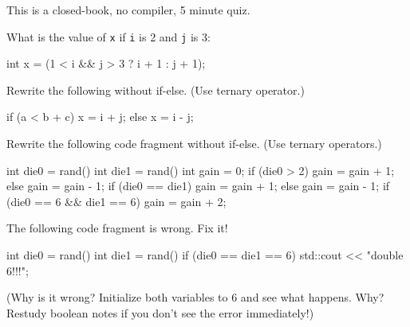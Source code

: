 

This is a closed-book, no compiler, 5 minute quiz.

\nextq
What is the value of \verb!x! if \verb!i! is 2 and \verb!j! is 3:
\begin{console}[fontsize=\footnotesize]
int x = (1 < i && j > 3 ? i + 1 : j + 1);
\end{console}
\ANSWER
\begin{answercode}

\end{answercode}

\nextq
Rewrite the following without if-else.
(Use ternary operator.)
\begin{console}[fontsize=\footnotesize]
if (a < b + c)
{
    x = i + j;
}
else
{
    x = i - j;
}
\end{console}
\ANSWER
\begin{answercode}

\end{answercode}

\nextq
Rewrite the following code fragment without if-else.
(Use ternary operators.)
\ANSWER
\begin{answercode}
int die0 = rand() %
int die1 = rand() %
int gain = 0;
if (die0 > 2)
{
    gain = gain + 1;
}
else
{
    gain = gain - 1;
}
if (die0 == die1)
{
    gain = gain + 1;
}
else
{
    gain = gain - 1;
}
if (die0 == 6 && die1 == 6)
{
    gain = gain + 2;
}
\end{answercode}

\nextq
The following code fragment is wrong. Fix it!
\\
\ANSWER
\begin{answercode}
int die0 = rand() %
int die1 = rand() %
if (die0 == die1 == 6)
{
    std::cout << "double 6!!!\n";
}
\end{answercode}
(Why is it wrong? Initialize both variables to 6 and see what happens. Why?
Restudy boolean notes if you don't see the error immediately!)


